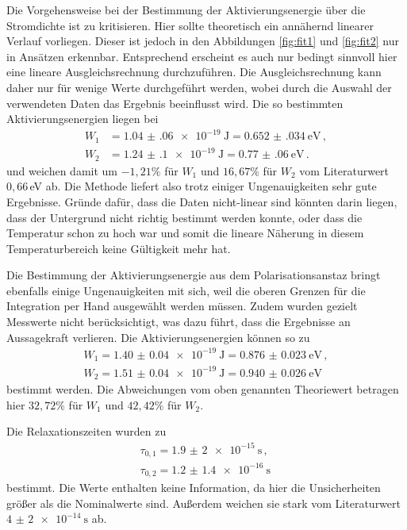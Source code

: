 Die Vorgehensweise bei der Bestimmung der Aktivierungsenergie über die Stromdichte ist zu kritisieren.
Hier sollte theoretisch ein annähernd linearer Verlauf vorliegen. Dieser ist jedoch
in den Abbildungen \ref{fig:fit1} und \ref{fig:fit2} nur in Ansätzen erkennbar.
Entsprechend erscheint es auch nur bedingt sinnvoll hier eine lineare Ausgleichsrechnung
durchzuführen. Die Ausgleichsrechnung kann daher nur für wenige Werte durchgeführt
werden, wobei durch die Auswahl der verwendeten Daten das Ergebnis beeinflusst
wird. Die so bestimmten Aktivierungsenergien liegen bei
\begin{align}
  W_1&=\SI{1.04(06)e-19}{\joule}= \SI{0.652(034)}{\eV}  \,, \\
  W_2&=\SI{1.24(10)e-19}{\joule}=\SI{0.77(06)}{\eV} \,.
\end{align}
und weichen damit um $-1{,}21\%$ für $W_1$ und $16{,}67\%$ für
$W_2$ vom Literaturwert $0{,}66\,$eV ab. Die Methode liefert also trotz einiger
Ungenauigkeiten sehr gute Ergebnisse.
Gründe dafür, dass die Daten nicht-linear sind könnten darin liegen, dass der Untergrund
nicht richtig bestimmt werden konnte, oder dass die Temperatur schon zu hoch war und somit
die lineare Näherung in diesem Temperaturbereich keine Gültigkeit mehr hat.

Die Bestimmung der Aktivierungsenergie aus dem Polarisationsanstaz bringt ebenfalls
einige Ungenauigkeiten mit sich, weil die oberen Grenzen für die Integration per Hand
ausgewählt werden müssen. Zudem wurden gezielt Messwerte nicht berücksichtigt, was
dazu führt, dass die Ergebnisse an Aussagekraft verlieren. Die Aktivierungsenergien
können so zu
\begin{align*}
	W_1=\SI{1.40(4)e-19}{\joule}=\SI{0.876(23)}{\eV} \,, \\
	W_2=\SI{1.51(4)e-19}{\joule}=\SI{0.940(26)}{\eV} \,
\end{align*}
bestimmt werden. Die Abweichungen vom oben genannten Theoriewert betragen hier
$32{,}72\%$ für $W_1$ und $42{,}42\%$ für $W_2$.

Die Relaxationszeiten wurden zu
\begin{align*}
	\tau_{0,1}=\SI{1.9(20)e-15}{\second} \,, \\
	\tau_{0,2}=\SI{1.2(14)e-16}{\second} \,
\end{align*}
bestimmt. Die Werte enthalten keine Information, da hier die Unsicherheiten größer
als die Nominalwerte sind. Außerdem weichen sie stark vom Literaturwert  $\SI{4(2)e-14}{\second}$
ab.
